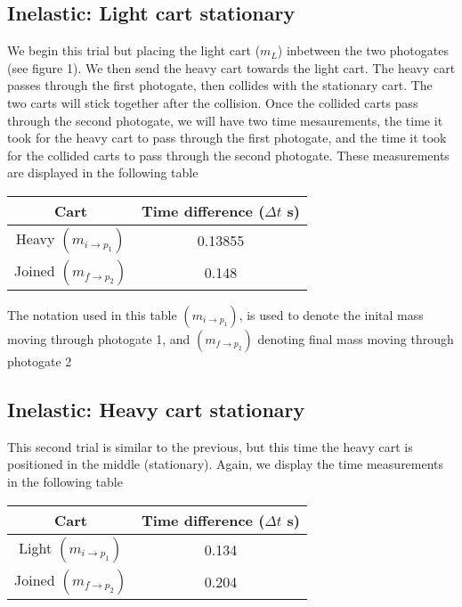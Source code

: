 \documentclass{report}
\begin{document}
    \subsection{Inelastic: Light cart stationary}
    \bigbreak \noindent 
    We begin this trial but placing the light cart ($m_{L}$) inbetween the two photogates (see figure 1). We then send the heavy cart towards the light cart. The heavy cart passes through the first photogate, then collides with the stationary cart. The two carts will stick together after the collision.
    \bigbreak \noindent 
    Once the collided carts pass through the second photogate, we will have two time mesaurements, the time it took for the heavy cart to pass through the first photogate, and the time it took for the collided carts to pass through the second photogate. These measurements are displayed in the following table
    \bigbreak \noindent 
    \begin{center}
        \begin{tabular}{c|c}
            Cart & Time difference ($\Delta t$ s) \\
            \hline
            Heavy $(m_{i\rightarrow p_{1}}) $ & 0.13855 \\
            Joined $(m_{f \rightarrow p_{2}})$ & 0.148
        \end{tabular}
    \end{center}
    \bigbreak \noindent 
    The notation used in this table $(m_{i \rightarrow p_{1}})$, is used to denote the inital mass moving through photogate 1, and $(m_{f \rightarrow p_{2}})$ denoting final mass moving through photogate 2
    \bigbreak \noindent 

    \bigbreak \noindent 
    \subsection{Inelastic: Heavy cart stationary}
    \bigbreak \noindent 
    This second trial is similar to the previous, but this time the heavy cart is positioned in the middle (stationary).
    \bigbreak \noindent 
    Again, we display the time measurements in the following table
    \bigbreak \noindent 
    \begin{center}
        \begin{tabular}{c|c}
            Cart & Time difference ($\Delta t$ s) \\
            \hline
            Light $(m_{i\rightarrow p_{1}}) $ & 0.134 \\
            Joined $(m_{f\rightarrow p_{2}}) $& 0.204
        \end{tabular}
    \end{center}
\end{document}

